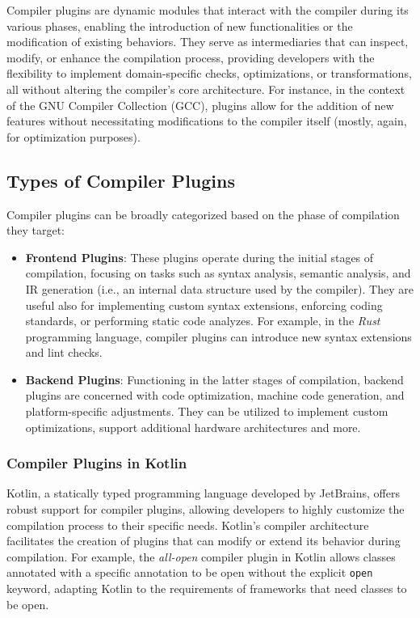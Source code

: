 \documentclass[12pt,a4paper,openright,twoside]{book}
\begin{document}
Compiler plugins are dynamic modules that interact with the compiler during its
various phases, enabling the introduction of new functionalities or the
modification of existing behaviors. They serve as intermediaries that can
inspect, modify, or enhance the compilation process, providing developers with
the flexibility to implement domain-specific checks, optimizations, or
transformations, all without altering the compiler's core architecture. 
%
For instance, in the context of the GNU Compiler Collection
(GCC), plugins allow for the addition of new features without necessitating
modifications to the compiler itself (mostly, again, for optimization purposes).

\subsection{Types of Compiler Plugins}

Compiler plugins can be broadly categorized based on the phase of compilation they target:

\begin{itemize}
  \item \textbf{Frontend Plugins}: These plugins operate during the initial
  stages of compilation, focusing on tasks such as syntax analysis, semantic
  analysis, and \ac{IR} generation (i.e., an internal data structure used by the
  compiler). They are useful also for implementing custom syntax extensions,
  enforcing coding standards, or performing static code analyzes. For example,
  in the \emph{Rust} programming language, compiler plugins can introduce new
  syntax extensions and lint checks. 

  \item \textbf{Backend Plugins}: Functioning in the latter stages of
  compilation, backend plugins are concerned with code optimization, machine
  code generation, and platform-specific adjustments. They can be utilized to
  implement custom optimizations, support additional hardware
  architectures and more.
\end{itemize}

\subsubsection{Compiler Plugins in Kotlin}

Kotlin, a statically typed programming language developed by JetBrains, offers
robust support for compiler plugins, allowing developers to highly customize the
compilation process to their specific needs. 
%
Kotlin's compiler architecture facilitates the creation of plugins that can
modify or extend its behavior during compilation. For example, the
\emph{all-open} compiler plugin in Kotlin allows classes annotated with a
specific annotation to be open without the explicit \lstinline{open} keyword,
adapting Kotlin to the requirements of frameworks that need classes to be
open. 
\end{document}

